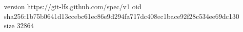 version https://git-lfs.github.com/spec/v1
oid sha256:1b75b0641d13ccebc61ec86e9d294fa717dc408ec1bace92f28c534ee69dc130
size 32864
